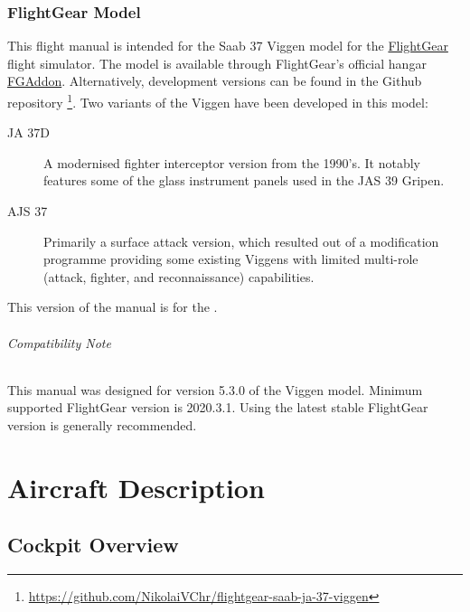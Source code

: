 \documentclass[a4paper]{report}
\newcommand{\variant}{\ifbool{AJS}{AJS 37}{JA 37D}}
\newcommand{\versionnumber}{5.3.0}
\begin{document}
\section*{FlightGear Model}
This flight manual is intended for the Saab 37 Viggen model
for the \href{http://www.flightgear.org}{FlightGear} flight simulator.
The model is available through FlightGear's official hangar
\href{http://wiki.flightgear.org/FGAddon}{FGAddon}.
Alternatively, development versions can be found in the Github repository%
\footnote{\url{https://github.com/NikolaiVChr/flightgear-saab-ja-37-viggen}}.
Two variants of the Viggen have been developed in this model:
\begin{description}
  \item[JA 37D] A modernised fighter interceptor version from the 1990's.
    It notably features some of the glass instrument panels used in the JAS 39 Gripen.
  \item[AJS 37] Primarily a surface attack version,
    which resulted out of a modification programme providing some existing Viggens
    with limited multi-role (attack, fighter, and reconnaissance) capabilities.
\end{description}
This version of the manual is for the \variant{}.

\paragraph*{Compatibility Note}
This manual was designed for version \versionnumber{} of the Viggen model.
Minimum supported FlightGear version is 2020.3.1.
Using the latest stable FlightGear version is generally recommended.


\part{Aircraft Description}
\chapter{Cockpit Overview}
\end{document}
